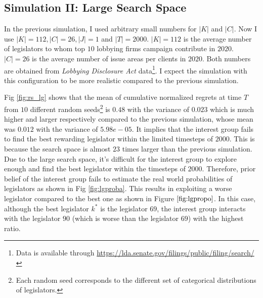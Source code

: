 \documentclass{article}
\begin{document}
\subsection{\large{Simulation II: Large Search Space}}\label{sim2}
In the previous simulation, 
I used 
arbitrary small numbers for $|K|$ and $|C|$.
Now I use $|K|=112, |C|=26, |J|=1$ and $|T|=2000$.
$|K|=112$ is the average number of 
legislators to whom top 
$10$ lobbying firms campaign contribute in $2020$.
$|C|=26$ is the average number of
issue areas per clients in $2020$.
Both numbers are obtained from \textit{Lobbying Disclosure Act} data\footnote{Data is available through \url{https://lda.senate.gov/filings/public/filing/search/}}.
I expect the simulation with this configuration to be more realistic compared to the previous simulation.

Fig \ref{fig:rs_lg} shows that the mean of cumulative normalized regrets at time $T$ from 
$10$ different random seeds\footnote{Each random seed  
corresponds to the different set of categorical distributions of legislators. 
} is $0.48$ with the variance of $0.023$ which is much higher and larger respectively compared to the previous simulation, whose mean was $0.012$ with the variance of $5.98e-05$.
It implies that the interest group fails to find the best rewarding legislator within the limited timesteps of $2000$.
This is because 
the search space is almost $23$ times larger than the previous simulation.
Due to the large search space, 
it's difficult for the interest group to 
explore enough and find the best legislator within the timesteps of $2000$.
Therefore, prior belief of the interest group fails to estimate 
the real world probabilities of legislators as shown in Fig \ref{fig:lgproba}.
This results in exploiting 
a worse legislator compared to the best one 
as shown in Figure $\ref{fig:lgpropo}$.
In this case, although the best legislator $k^*$ is the legislator $69$, 
the interest group interacts with the legislator $90$ (which is worse than the legislator $69$) with the highest ratio. 
\end{document}
